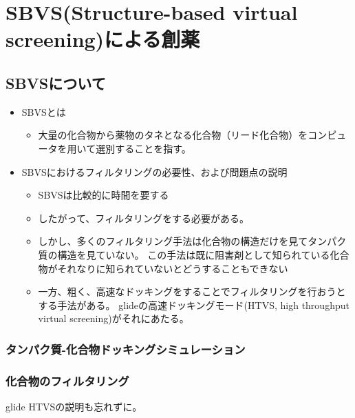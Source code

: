 \chapter{SBVS(Structure-based virtual screening)による創薬}
\section{SBVSについて}
\begin{itemize}
\item SBVSとは
	\begin{itemize}
	\item 大量の化合物から薬物のタネとなる化合物（リード化合物）をコンピュータを用いて選別することを指す。
	\end{itemize}
\item SBVSにおけるフィルタリングの必要性、および問題点の説明
	\begin{itemize}
	\item SBVSは比較的に時間を要する
	\item したがって、フィルタリングをする必要がある。
	\item しかし、多くのフィルタリング手法は化合物の構造だけを見てタンパク質の構造を見ていない。
		この手法は既に阻害剤として知られている化合物がそれなりに知られていないとどうすることもできない
	\item 一方、粗く、高速なドッキングをすることでフィルタリングを行おうとする手法がある。
		glideの高速ドッキングモード(HTVS, high throughput virtual screening)がそれにあたる。
	\end{itemize}
\end{itemize}
\subsection{タンパク質-化合物ドッキングシミュレーション}
\subsection{化合物のフィルタリング}
glide HTVSの説明も忘れずに。